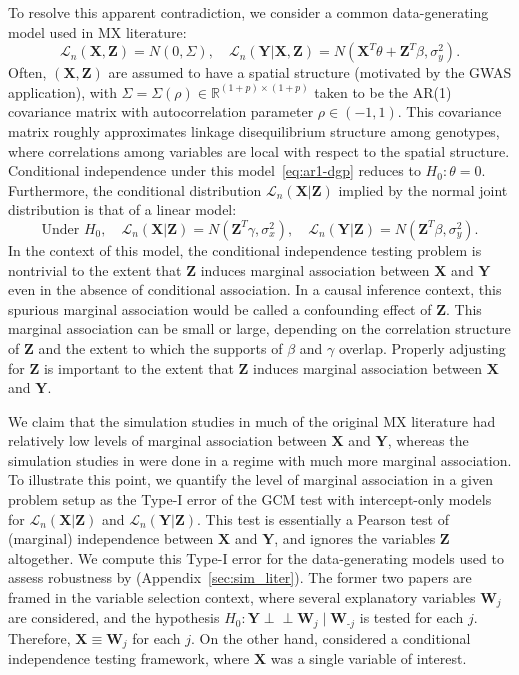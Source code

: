 \documentclass[12pt]{article}
\theoremstyle{definition}
\theoremstyle{remark}
\newcommand{\R}{\mathbb{R}}								%
\newcommand{\independent}{{\perp \! \! \! \perp}}		%
\newcommand{\prx}{\bm X}								%
\newcommand{\prz}{\bm Z}								%
\newcommand{\pry}{{\bm Y}}								%
\newcommand{\law}{\mathcal L}							%
\begin{document}
	To resolve this apparent contradiction, we consider a common data-generating model used in MX literature:
	\begin{equation}
		\law_n(\prx, \prz) = N(0, \Sigma), \quad \law_n(\pry|\prx,\prz) = N(\prx^T \theta + \prz^T \beta, \sigma^2_y).
		\label{eq:ar1-dgp}
	\end{equation}
	Often, $(\prx, \prz)$ are assumed to have a spatial structure (motivated by the GWAS application), with $\Sigma = \Sigma(\rho) \in \R^{(1+p) \times (1+p)}$ taken to be the AR(1) covariance matrix with autocorrelation parameter $\rho \in (-1,1)$. This covariance matrix roughly approximates linkage disequilibrium structure among genotypes, where correlations among variables are local with respect to the spatial structure. Conditional independence under this model~\eqref{eq:ar1-dgp} reduces to $H_0: \theta = 0$. Furthermore, the conditional distribution $\law_n(\prx|\prz)$ implied by the normal joint distribution is that of a linear model:
	\begin{equation}
		\text{Under } H_0, \quad  \law_n(\prx | \prz) = N(\prz^T \gamma, \sigma^2_x), \quad \law_n(\pry|\prz) = N(\prz^T \beta, \sigma^2_y).
	\end{equation}
	In the context of this model, the conditional independence testing problem is nontrivial to the extent that $\prz$ induces marginal association between $\prx$ and $\pry$ even in the absence of conditional association. In a causal inference context, this spurious marginal association would be called a confounding effect of $\prz$. This marginal association can be small or large, depending on the correlation structure of $\prz$ and the extent to which the supports of $\beta$ and $\gamma$ overlap. Properly adjusting for $\prz$ is important to the extent that $\prz$ induces marginal association between $\prx$ and $\pry$.

	We claim that the simulation studies in much of the original MX literature had relatively low levels of marginal association between $\prx$ and $\pry$, whereas the simulation studies in \citet{Li2022} were done in a regime with much more marginal association. To illustrate this point, we quantify the level of marginal association in a given problem setup as the Type-I error of the GCM test with intercept-only models for $\law_n(\prx|\prz)$ and $\law_n(\pry|\prz)$. This test is essentially a Pearson test of (marginal) independence between $\prx$ and $\pry$, and ignores the variables $\prz$ altogether. We compute this Type-I error for the data-generating models used to assess robustness by \citet{CetL16, Liu2022a, Li2022} (Appendix~\ref{sec:sim_liter}). The former two papers are framed in the variable selection context, where several explanatory variables $\bm W_j$ are considered, and the hypothesis $H_0: \pry \independent \bm W_j \mid \bm W_{\text{-}j}$ is tested for each $j$. Therefore, $\prx \equiv \bm W_j$ for each $j$. On the other hand, \citet{Li2022} considered a conditional independence testing framework, where $\prx$ was a single variable of interest.
	
\end{document}
